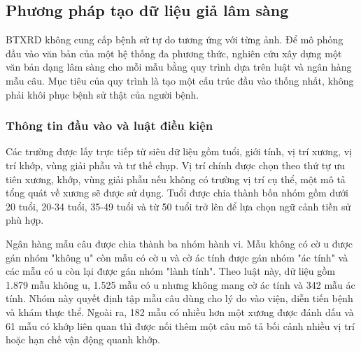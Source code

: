 \begin{table}[H]
\centering
\caption{Đặc điểm kỹ thuật của các tệp ảnh BTXRD}
\label{tab:appendix-btxrd-image-properties}
\small
{}
\end{table}

\subsection{Phương pháp tạo dữ liệu giả lâm sàng}

BTXRD không cung cấp bệnh sử tự do tương ứng với từng ảnh. Để mô phỏng đầu vào văn bản của một hệ thống đa phương thức, nghiên cứu xây dựng một văn bản dạng lâm sàng cho mỗi mẫu bằng quy trình dựa trên luật và ngân hàng mẫu câu. Mục tiêu của quy trình là tạo một cấu trúc đầu vào thống nhất, không phải khôi phục bệnh sử thật của người bệnh.

\subsubsection{Thông tin đầu vào và luật điều kiện}

Các trường được lấy trực tiếp từ siêu dữ liệu gồm tuổi, giới tính, vị trí xương, vị trí khớp, vùng giải phẫu và tư thế chụp. Vị trí chính được chọn theo thứ tự ưu tiên xương, khớp, vùng giải phẫu nếu không có trường vị trí cụ thể, một mô tả tổng quát về xương sẽ được sử dụng. Tuổi được chia thành bốn nhóm gồm dưới 20 tuổi, 20-34 tuổi, 35-49 tuổi và từ 50 tuổi trở lên để lựa chọn ngữ cảnh tiền sử phù hợp.

Ngân hàng mẫu câu được chia thành ba nhóm hành vi. Mẫu không có cờ u được gán nhóm "không u" còn mẫu có cờ u và cờ ác tính được gán nhóm "ác tính" và các mẫu có u còn lại được gán nhóm "lành tính". Theo luật này, dữ liệu gồm 1.879 mẫu không u, 1.525 mẫu có u nhưng không mang cờ ác tính và 342 mẫu ác tính. Nhóm này quyết định tập mẫu câu dùng cho lý do vào viện, diễn tiến bệnh và khám thực thể. Ngoài ra, 182 mẫu có nhiều hơn một xương được đánh dấu và 61 mẫu có khớp liên quan thì được nối thêm một câu mô tả bối cảnh nhiều vị trí hoặc hạn chế vận động quanh khớp.

